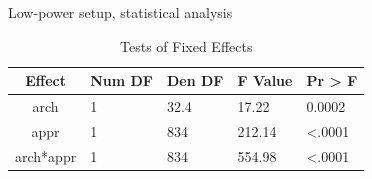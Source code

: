 \begin{table}[h]
    \caption{Low-power setup, statistical analysis}
	\begin{subtable}[h]{0.47\textwidth}
	    \centering
	    \caption{Tests of Fixed Effects}
	    \begin{adjustbox}{max width=0.6\columnwidth}
		\begin{tabular}{>{\columncolor[rgb]{0.93,0.95,0.98}}cllll}
        \toprule
        \rowcolor[rgb]{0.93,0.95,0.98}
            \color[rgb]{0.07,0.13,0.47}\textbf{Effect} &
            \color[rgb]{0.07,0.13,0.47}\textbf{Num DF} &
            \color[rgb]{0.07,0.13,0.47}\textbf{Den DF} &
            \color[rgb]{0.07,0.13,0.47}\textbf{F Value} &
            \color[rgb]{0.07,0.13,0.47}\textbf{Pr > F} \\
        \midrule
        arch           & 1 & 32.4 & 17.22 & 0.0002 \\
        \midrule
        appr           & 1 & 834 & 212.14 & \textless{}.0001 \\
        \midrule
        arch*appr           & 1 & 834 & 554.98 & \textless{}.0001 \\
        \bottomrule
        \end{tabular}
		\end{adjustbox}
	
	\label{tab:lp_tab_1}
	\end{subtable}
	\hfill


\end{table}
